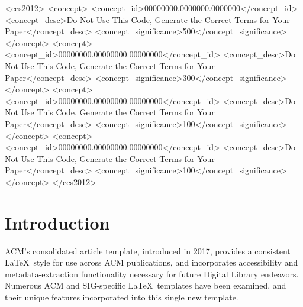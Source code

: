 \documentclass[manuscript,screen,review]{acmart}
\begin{document}
\begin{CCSXML}
<ccs2012>
 <concept>
  <concept_id>00000000.0000000.0000000</concept_id>
  <concept_desc>Do Not Use This Code, Generate the Correct Terms for Your Paper</concept_desc>
  <concept_significance>500</concept_significance>
 </concept>
 <concept>
  <concept_id>00000000.00000000.00000000</concept_id>
  <concept_desc>Do Not Use This Code, Generate the Correct Terms for Your Paper</concept_desc>
  <concept_significance>300</concept_significance>
 </concept>
 <concept>
  <concept_id>00000000.00000000.00000000</concept_id>
  <concept_desc>Do Not Use This Code, Generate the Correct Terms for Your Paper</concept_desc>
  <concept_significance>100</concept_significance>
 </concept>
 <concept>
  <concept_id>00000000.00000000.00000000</concept_id>
  <concept_desc>Do Not Use This Code, Generate the Correct Terms for Your Paper</concept_desc>
  <concept_significance>100</concept_significance>
 </concept>
</ccs2012>
\end{CCSXML}




\maketitle

\section{Introduction}
ACM's consolidated article template, introduced in 2017, provides a
consistent \LaTeX\ style for use across ACM publications, and
incorporates accessibility and metadata-extraction functionality
necessary for future Digital Library endeavors. Numerous ACM and
SIG-specific \LaTeX\ templates have been examined, and their unique
features incorporated into this single new template.
\end{document}
